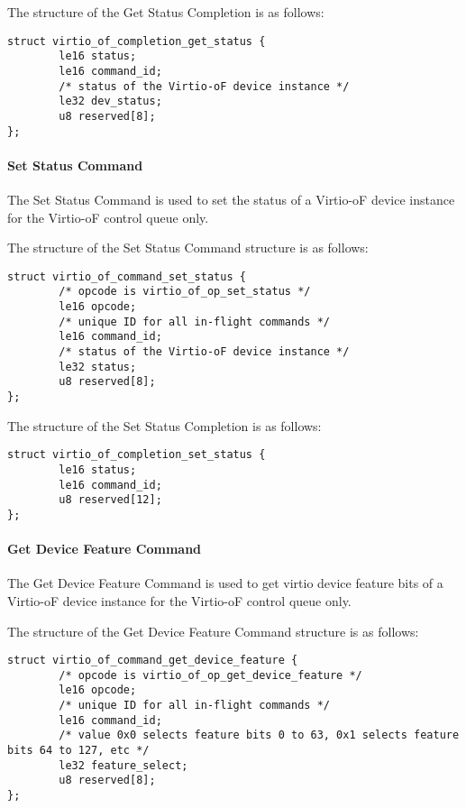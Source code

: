The structure of the Get Status Completion is as follows:
\begin{lstlisting}
struct virtio_of_completion_get_status {
        le16 status;
        le16 command_id;
        /* status of the Virtio-oF device instance */
        le32 dev_status;
        u8 reserved[8];
};
\end{lstlisting}

\paragraph{Set Status Command}\label{sec:Virtio Transport Options / Virtio Over Fabrics / Commands Definition / Opcodes / Set Status Command}
The Set Status Command is used to set the status of a Virtio-oF device instance for the Virtio-oF control queue only.

The structure of the Set Status Command structure is as follows:
\begin{lstlisting}
struct virtio_of_command_set_status {
        /* opcode is virtio_of_op_set_status */
        le16 opcode;
        /* unique ID for all in-flight commands */
        le16 command_id;
        /* status of the Virtio-oF device instance */
        le32 status;
        u8 reserved[8];
};
\end{lstlisting}

The structure of the Set Status Completion is as follows:
\begin{lstlisting}
struct virtio_of_completion_set_status {
        le16 status;
        le16 command_id;
        u8 reserved[12];
};
\end{lstlisting}

\paragraph{Get Device Feature Command}\label{sec:Virtio Transport Options / Virtio Over Fabrics / Commands Definition / Opcodes / Get Device Feature Command}
The Get Device Feature Command is used to get virtio device feature bits of a Virtio-oF device instance for the Virtio-oF control queue only.

The structure of the Get Device Feature Command structure is as follows:
\begin{lstlisting}
struct virtio_of_command_get_device_feature {
        /* opcode is virtio_of_op_get_device_feature */
        le16 opcode;
        /* unique ID for all in-flight commands */
        le16 command_id;
        /* value 0x0 selects feature bits 0 to 63, 0x1 selects feature bits 64 to 127, etc */
        le32 feature_select;
        u8 reserved[8];
};
\end{lstlisting}

